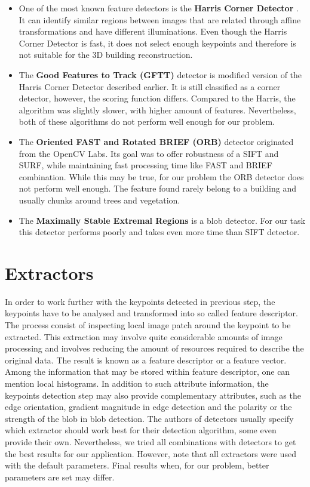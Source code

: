 \begin{itemize}
	\item One of the most known feature detectors is the \textbf{Harris Corner Detector} . It can identify similar regions between images that are related through affine transformations and have different illuminations. Even though the Harris Corner Detector is fast, it does not select enough keypoints and therefore is not suitable for the 3D building reconstruction. \cite{www:harris}
	
	\item The \textbf{Good Features to Track (GFTT)} detector is modified version of the Harris Corner Detector described earlier. It is still classified as a corner detector, however, the scoring function differs. Compared to the Harris, the algorithm was slightly slower, with higher amount of features. Nevertheless, both of these algorithms do not perform well enough for our problem. \cite{article:gftt}
	
	\item The \textbf{Oriented FAST and Rotated BRIEF (ORB)} detector originated from the OpenCV Labs. Its goal was to offer robustness of a SIFT and SURF, while maintaining fast processing time like FAST and BRIEF combination. While this may be true, for our problem the ORB detector does not perform well enough. The feature found rarely belong to a building and usually chunks around trees and vegetation. \cite{www:orb}\cite{article:orb}
	
	\item The \textbf{Maximally Stable Extremal Regions} is a blob detector. For our task this detector performs poorly and takes even more time than SIFT detector.
\end{itemize}

\section{Extractors}
\label{sec:extractors}
In order to work further with the keypoints detected in previous step, the keypoints have to be analysed and transformed into so called feature descriptor. The process consist of inspecting local image patch around the keypoint to be extracted. This extraction may involve quite considerable amounts of image processing and involves reducing the amount of resources required to describe the original data. The result is known as a feature descriptor or a feature vector. Among the information that may be stored within feature descriptor, one can mention local histograms. In addition to such attribute information, the keypoints detection step may also provide complementary attributes, such as the edge orientation, gradient magnitude in edge detection and the polarity or the strength of the blob in blob detection. The authors of detectors usually specify which extractor should work best for their detection algorithm, some even provide their own. Nevertheless, we tried all combinations with detectors to get the best results for our application. However, note that all extractors were used with the default parameters. Final results when, for our problem, better parameters are set may differ.


